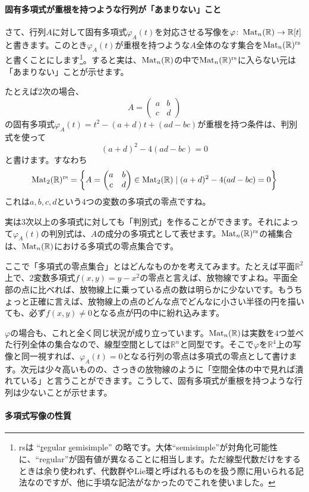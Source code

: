 \paragraph{固有多項式が重根を持つような行列が「あまりない」こと}

さて、行列$A$に対して固有多項式$\varphi_A(t)$を対応させる写像を$\varphi\colon \operatorname{Mat}_n(\mathbb{R}) \rightarrow \mathbb{R}[t]$と書きます。このとき$\varphi_A(t)$が重根を持つような$A$全体のなす集合を$\operatorname{Mat}_n(\mathbb{R})^{\text{rs}}$と書くことにします\footnote{rsは ``\uline{r}egular \uline{s}emisimple'' の略です。大体``semisimple''が対角化可能性に、``regular''が固有値が異なることに相当します。ただ線型代数だけをするときは余り使われず、代数群やLie環と呼ばれるものを扱う際に用いられる記法なのですが、他に手頃な記法がなかったのでこれを使いました。}。すると実は、$\operatorname{Mat}_n(\mathbb{R})$の中で$\operatorname{Mat}_n(\mathbb{R})^{\text{rs}}$に入らない元は「あまりない」ことが示せます。

たとえば$2$次の場合、
\[
A = 
\begin{pmatrix}
a & b \\
c & d
\end{pmatrix}
\]
の固有多項式$\varphi_A(t) = t^2 - (a + d)t + (ad - bc)$が重根を持つ条件は、判別式を使って
\[
(a + d)^2 - 4(ad - bc) = 0
\]
と書けます。すなわち
\[
\operatorname{Mat}_2(\mathbb{R})^{\text{rs}} =
\biggl\{
A = 
\begin{pmatrix}
a & b \\
c & d
\end{pmatrix}
\in \operatorname{Mat}_2(\mathbb{R})
\mid
(a + d)^2 - 4(ad - bc) = 0
\biggr\}
\]
これは$a, b, c, d$という$4$つの変数の多項式の零点ですね。

実は$3$次以上の多項式に対しても「判別式」を作ることができます。それによって$\varphi_A(t)$の判別式は、$A$の成分の多項式として表せます。$\operatorname{Mat}_n(\mathbb{R})^{\text{rs}}$の補集合は、$\operatorname{Mat}_n(\mathbb{R})$における多項式の零点集合です。

ここで「多項式の零点集合」とはどんなものかを考えてみます。たとえば平面$\mathbb{R}^2$上で、$2$変数多項式$f(x, y) = y - x^2$の零点と言えば、放物線ですよね。平面全部の点に比べれば、放物線上に乗っている点の数は明らかに少ないです。もうちょっと正確に言えば、放物線上の点のどんな点でどんなに小さい半径の円を描いても、必ず$f(x, y) \neq 0$となる点が円の中に紛れ込みます。

$\varphi$の場合も、これと全く同じ状況が成り立っています。$\operatorname{Mat}_n(\mathbb{R})$は実数を$4$つ並べた行列全体の集合なので、線型空間としては$\mathbb{R}^n$と同型です。そこで$\varphi$を$\mathbb{R}^4$上の写像と同一視すれば、$\varphi_A(t) = 0$となる行列の零点は多項式の零点として書けます。次元は少々高いものの、さっきの放物線のように「空間全体の中で見れば潰れている」と言うことができます。こうして、固有多項式が重根を持つような行列は少ないことが示せます。

\paragraph{多項式写像の性質}


